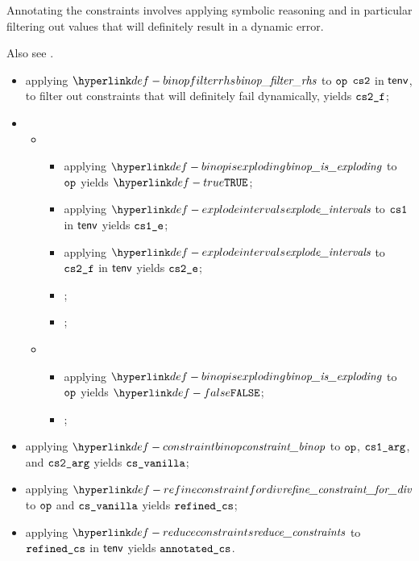 Annotating the constraints involves applying symbolic reasoning and in particular filtering out values that
will definitely result in a dynamic error.

Also see .

\ProseParagraph
\AllApply
\begin{itemize}
  \item applying $\binopfilterrhs$ to $\texttt{op}$ $\texttt{cs2}$ in $\textsf{tenv}$, to filter out constraints that will definitely fail dynamically, yields $\texttt{cs2\_f}$;
  \item \OneApplies
  \begin{itemize}
    \item {}
    \begin{itemize}
      \item applying $\binopisexploding$ to $\texttt{op}$ yields $\True$;
      \item applying $\explodeintervals$ to $\texttt{cs1}$ in $\textsf{tenv}$ yields $\texttt{cs1\_e}$;
      \item applying $\explodeintervals$ to $\texttt{cs2\_f}$ in $\textsf{tenv}$ yields $\texttt{cs2\_e}$;
      \item {};
      \item {};
    \end{itemize}

    \item {}
    \begin{itemize}
      \item applying $\binopisexploding$ to $\texttt{op}$ yields $\False$;
      \item \Proseeqdef{$(\csonearg, \cstwoarg)$}{$(\csone, \cstwof)$};
    \end{itemize}
  \end{itemize}
  \item applying $\constraintbinop$ to $\texttt{op}$, $\texttt{cs1\_arg}$, and $\texttt{cs2\_arg}$ yields $\texttt{cs\_vanilla}$;
  \item applying $\refineconstraintfordiv$ to $\texttt{op}$ and $\texttt{cs\_vanilla}$ yields $\texttt{refined\_cs}$\ProseOrTypeError;
  \item applying $\reduceconstraints$ to $\texttt{refined\_cs}$ in $\textsf{tenv}$ yields $\texttt{annotated\_cs}$.
\end{itemize}

